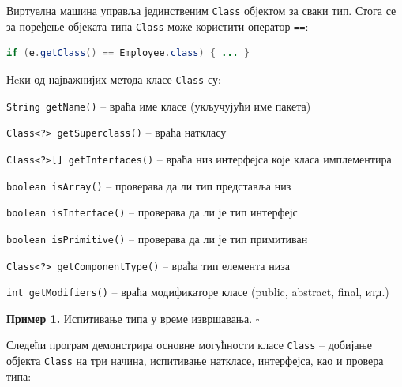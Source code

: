 Виртуелна машина управља јединственим \texttt{Class} објектом за сваки тип. Стога се за поређење објеката типа \texttt{Class} може користити оператор \texttt{==}:

\begin{lstlisting}[language=Java]
if (e.getClass() == Employee.class) { ... }
\end{lstlisting}


Нeки од најважнијих метода класе \texttt{Class} су:

\texttt{String getName()} – враћа име класе (укључујући име пакета)

\texttt{Class\textless{}?\textgreater{} getSuperclass()} – враћа наткласу

\texttt{Class\textless{}?\textgreater{}[] getInterfaces()} – враћа низ интерфејса које класа имплементира

\texttt{boolean isArray()} – проверава да ли тип представља низ

\texttt{boolean isInterface()} – проверава да ли је тип интерфејс

\texttt{boolean isPrimitive()} – проверава да ли је тип примитиван

\texttt{Class\textless{}?\textgreater{} getComponentType()} – враћа тип елемента низа

\texttt{int getModifiers()} – враћа модификаторе класе (public, abstract, final, итд.)


\bigskip

\noindent \textbf{Пример 1.} Испитивање типа у време извршавања. $\square$

\medskip

Следећи програм демонстрира основне могућности класе \texttt{Class} – добијање објекта \texttt{Class} на три начина, испитивање наткласе, интерфејса, као и провера типа:

